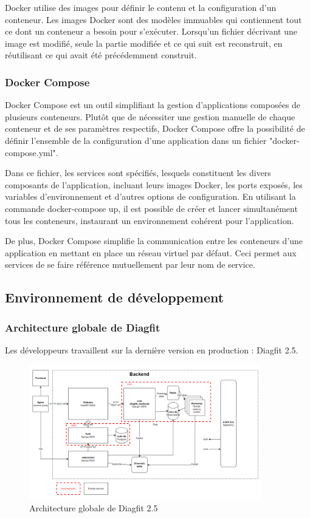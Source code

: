 Docker utilise des images pour définir le contenu et la configuration d'un conteneur.
Les images Docker sont des modèles immuables qui contiennent tout ce dont un conteneur a besoin pour s'exécuter.
Lorsqu'un fichier décrivant une image est modifié, seule la partie modifiée et ce qui suit est reconstruit, en réutilisant ce qui avait été précédemment construit.

\subsubsection{Docker Compose}
Docker Compose est un outil simplifiant la gestion d'applications composées de plusieurs conteneurs.
Plutôt que de nécessiter une gestion manuelle de chaque conteneur et de ses paramètres respectifs, Docker Compose offre la possibilité de définir l'ensemble de la configuration d'une application dans un fichier "docker-compose.yml".

Dans ce fichier, les services sont spécifiés, lesquels constituent les divers composants de l'application, incluant leurs images Docker, les ports exposés, les variables d'environnement et d'autres options de configuration.
En utilisant la commande docker-compose up, il est possible de créer et lancer simultanément tous les conteneurs, instaurant un environnement cohérent pour l'application.

De plus, Docker Compose simplifie la communication entre les conteneurs d'une application en mettant en place un réseau virtuel par défaut.
Ceci permet aux services de se faire référence mutuellement par leur nom de service.


\subsection{Environnement de développement}
\subsubsection{Architecture globale de Diagfit}
Les développeurs travaillent sur la dernière version en production : Diagfit 2.5.

\begin{figure}[ht!]
    \centering
    \includegraphics[width=0.9\textwidth]{paper/figures/archi2-5.png}
    \caption{Architecture globale de Diagfit 2.5}
    \label{fig:archi2-5}
\end{figure}

